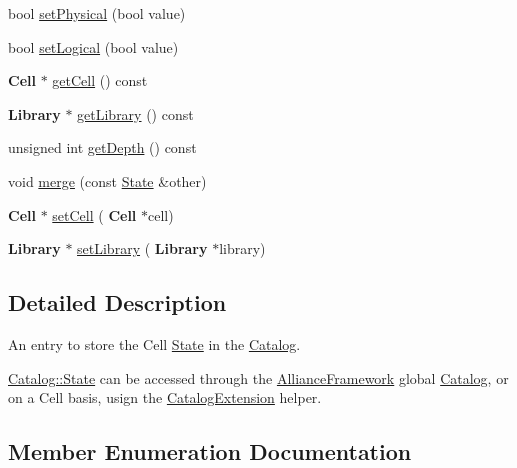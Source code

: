 \begin{DoxyCompactItemize}
\item 
bool \hyperlink{classCRL_1_1Catalog_1_1State_a85a091727c8e7de2b16d01088324de0d}{set\+Physical} (bool value)
\item 
bool \hyperlink{classCRL_1_1Catalog_1_1State_af41327abeb4e7646ef5cafabe8eeabd0}{set\+Logical} (bool value)
\item 
\textbf{ Cell} $\ast$ \hyperlink{classCRL_1_1Catalog_1_1State_a0cc5ef54176f8207ef4e723eed62c35e}{get\+Cell} () const
\item 
\textbf{ Library} $\ast$ \hyperlink{classCRL_1_1Catalog_1_1State_a89dad78f1829b1ee3177f61e2f73d6c6}{get\+Library} () const
\item 
unsigned int \hyperlink{classCRL_1_1Catalog_1_1State_a0232ad6dcfda1e2801f788deaad83e08}{get\+Depth} () const
\item 
void \hyperlink{classCRL_1_1Catalog_1_1State_a41fde67f1b88de06cae113a0d8108f25}{merge} (const \hyperlink{classCRL_1_1Catalog_1_1State}{State} \&other)
\item 
\textbf{ Cell} $\ast$ \hyperlink{classCRL_1_1Catalog_1_1State_a156714ad3fe2e5bb8ad8549d101526fe}{set\+Cell} (\textbf{ Cell} $\ast$cell)
\item 
\textbf{ Library} $\ast$ \hyperlink{classCRL_1_1Catalog_1_1State_a821ac2ae33f0045232cab612ab12f84b}{set\+Library} (\textbf{ Library} $\ast$library)
\end{DoxyCompactItemize}


\subsection{Detailed Description}
An entry to store the Cell \hyperlink{classCRL_1_1Catalog_1_1State}{State} in the \hyperlink{classCRL_1_1Catalog}{Catalog}. 

\hyperlink{classCRL_1_1Catalog_1_1State}{Catalog\+::\+State} can be accessed through the \hyperlink{classCRL_1_1AllianceFramework}{Alliance\+Framework} global \hyperlink{classCRL_1_1Catalog}{Catalog}, or on a Cell basis, usign the \hyperlink{classCRL_1_1CatalogExtension}{Catalog\+Extension} helper. 

\subsection{Member Enumeration Documentation}
\mbox{\label{classCRL_1_1Catalog_1_1State_a625003526d38ac7500b4ad7de35e2d74}} 
